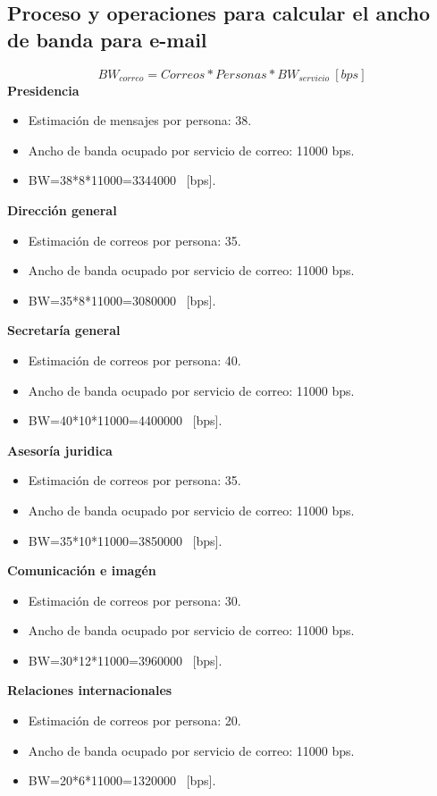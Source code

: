 \documentclass[12pt,letterpaper]{article}
\begin{document}
\newpage
\subsection{Proceso y operaciones para calcular el ancho de banda para e-mail}
\begin{equation}
    BW_{correo}=Correos*Personas*BW_{servicio} \ [bps]
\end{equation}
\textbf{Presidencia}
\begin{itemize}
    \item Estimación de mensajes por persona: 38. 
    \item Ancho de banda ocupado por servicio de correo: 11000 bps.
    \item BW=38*8*11000=3344000 \ [bps].
\end{itemize}
\textbf{Dirección general}
\begin{itemize}
    \item Estimación de correos por persona: 35. 
    \item Ancho de banda ocupado por servicio de correo: 11000 bps.
    \item BW=35*8*11000=3080000 \ [bps].
\end{itemize}
\textbf{Secretaría general}
\begin{itemize}
    \item Estimación de correos por persona: 40. 
    \item Ancho de banda ocupado por servicio de correo: 11000 bps.
    \item BW=40*10*11000=4400000 \ [bps].
\end{itemize}
\textbf{Asesoría juridica}
\begin{itemize}
    \item Estimación de correos por persona: 35. 
    \item Ancho de banda ocupado por servicio de correo: 11000 bps.
    \item BW=35*10*11000=3850000 \ [bps].
\end{itemize}
\textbf{Comunicación e imagén}
\begin{itemize}
    \item Estimación de correos por persona: 30. 
    \item Ancho de banda ocupado por servicio de correo: 11000 bps.
    \item BW=30*12*11000=3960000 \ [bps].
\end{itemize}
\textbf{Relaciones internacionales}
\begin{itemize}
    \item Estimación de correos por persona: 20. 
    \item Ancho de banda ocupado por servicio de correo: 11000 bps.
    \item BW=20*6*11000=1320000 \ [bps].
\end{itemize}
\end{document}

